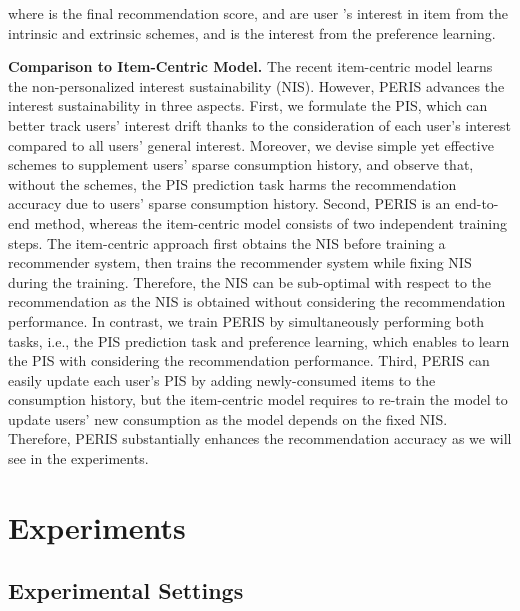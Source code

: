 \documentclass[sigconf]{acmart}
\newcommand{\MD}{{\small\textsf{PERIS}}}
\begin{document}
where  is the final recommendation score,  and  are user 's interest in item  from the intrinsic and extrinsic schemes, and  is the interest from the preference learning.  

\smallskip
\noindent\textbf{Comparison to Item-Centric Model.} The recent item-centric model \cite{hyun2020interest} learns the non-personalized interest sustainability (NIS). However, \MD{} advances the interest sustainability in three aspects. 
First, we formulate the PIS, which can better track users' interest drift thanks to the consideration of each user's interest compared to all users' general interest. Moreover, we devise simple yet effective schemes to supplement users' sparse consumption history, and observe that, without the schemes, the PIS prediction task harms the recommendation accuracy due to users' sparse consumption history.
Second, \MD{} is an end-to-end method, whereas the item-centric model consists of two independent training steps. The item-centric approach first obtains the NIS before training a recommender system, then trains the recommender system while fixing NIS during the training. Therefore, the NIS can be sub-optimal with respect to the recommendation as the NIS is obtained without considering the recommendation performance. In contrast, we train \MD{} by simultaneously performing both tasks, i.e., the PIS prediction task and preference learning, which enables to learn  the PIS with considering the recommendation performance.
Third, \MD{} can easily update each user's PIS by adding newly-consumed items to the consumption history, but the item-centric model requires to re-train the model to update users' new consumption as the model depends on the fixed NIS. Therefore, \MD{} substantially enhances the recommendation accuracy as we will see in the experiments.


\section{Experiments}

\subsection{Experimental Settings}
\end{document}
